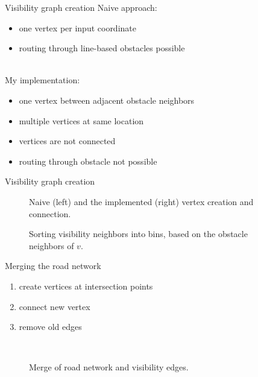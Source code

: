 \documentclass[xcolor={x11names}]{beamer}
\renewcommand{\n}{\hfill\\[0.5ex]}
\newcommand{\nn}{\hfill\\[2ex]}
\newenvironment{figcenter}
{%
	\parskip=0pt%
	\par%
	\nopagebreak%
	\centering%
}%
{%
	\par%
	\noindent%
	\ignorespacesafterend%
}
\begin{document}
		\begin{frame}{Visibility graph creation}
			Naive approach:
			\begin{itemize}
				\item one vertex per input coordinate
				\item routing through line-based obstacles possible
			\end{itemize}
			\nn
			\pause
			My implementation:
			\begin{itemize}
				\item one vertex between adjacent obstacle neighbors
				\item multiple vertices at same location
				\item vertices are not connected
				\item routing through obstacle not possible
			\end{itemize}
		\end{frame}
	
		\begin{frame}{Visibility graph creation}
			\vspace{0.35cm}
			\begin{figure}
				\begin{figcenter}
					\scalebox{0.7}
					{
						
					}
					\hspace{0.75cm}
					\scalebox{0.7}
					{
						
					}
				\end{figcenter}
				\caption{Naive (left) and the implemented (right) vertex creation and connection.}
			\end{figure}
			\vspace{-0.3cm}
			\pause
			\begin{figure}
				\begin{figcenter}
					\scalebox{0.7}
					{
						
					}
				\end{figcenter}
				\caption{Sorting visibility neighbors into bins, based on the obstacle neighbors of $v$.}
			\end{figure}
		\end{frame}
		
		\begin{frame}{Merging the road network}
			\begin{enumerate}
				\item create vertices at intersection points
				\item connect new vertex
				\item remove old edges
			\end{enumerate}
			\n
			\begin{figure}
				\begin{figcenter}
					\scalebox{0.7}
					{
						
					}
					\hspace{0.75cm}
					\scalebox{0.7}
					{
						
					}
				\end{figcenter}
				\caption{Merge of road network and visibility edges.}
			\end{figure}
		\end{frame}
		
\end{document}
